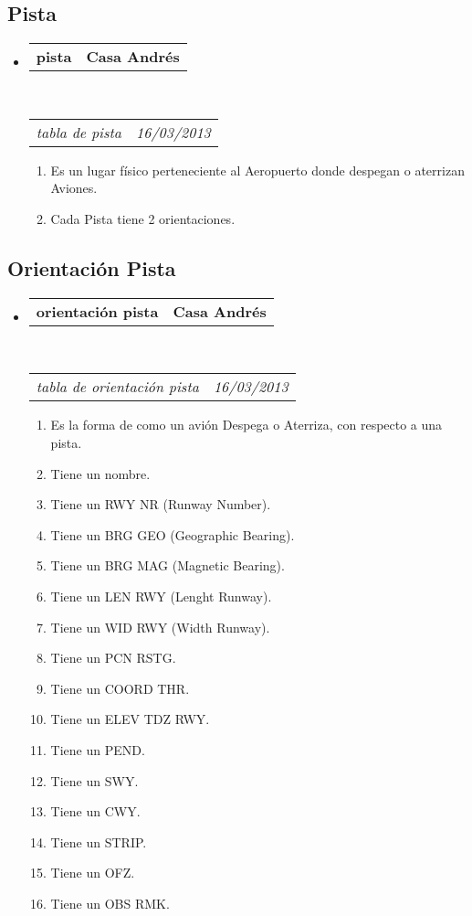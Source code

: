 \documentclass[10pt,letterpaper]{article}
\makeatletter
\newcommand{\headerrow}[2]
{\begin{tabular*}{\linewidth}{l@{\extracolsep{\fill}}r}
	#1 &
	#2 \\
\end{tabular*}}
\makeatother
\begin{document}
\subsection*{Pista}

\begin{itemize}
	\parskip=0.1em

	\item
	\headerrow
		{\textbf{pista}}
		{\textbf{Casa Andrés}}
	\\
	\headerrow
		{\emph{tabla de pista}}
		{\emph{16/03/2013}}
	\begin{enumerate}
		\item Es un lugar físico perteneciente al Aeropuerto donde despegan o aterrizan Aviones.
		\item Cada Pista tiene 2 orientaciones.
		
	\end{enumerate}

\end{itemize}

\subsection*{Orientación Pista}

\begin{itemize}
	\parskip=0.1em

	\item
	\headerrow
		{\textbf{orientación pista}}
		{\textbf{Casa Andrés}}
	\\
	\headerrow
		{\emph{tabla de orientación pista}}
		{\emph{16/03/2013}}
	\begin{enumerate}
		\item Es la forma de como un avión Despega o Aterriza, con respecto a una pista.
		\item Tiene un nombre.
		\item Tiene un RWY NR (Runway Number).
		\item Tiene un BRG GEO (Geographic Bearing).
		\item Tiene un BRG MAG (Magnetic Bearing).
		\item Tiene un LEN RWY (Lenght Runway).
		\item Tiene un WID RWY (Width Runway).
		\item Tiene un PCN RSTG.
		\item Tiene un COORD THR.
		\item Tiene un ELEV TDZ RWY.
		\item Tiene un PEND.
		\item Tiene un SWY.
		\item Tiene un CWY.
		\item Tiene un STRIP.
		\item Tiene un OFZ.
		\item Tiene un OBS RMK.
	\end{enumerate}

\end{itemize}
\end{document}
